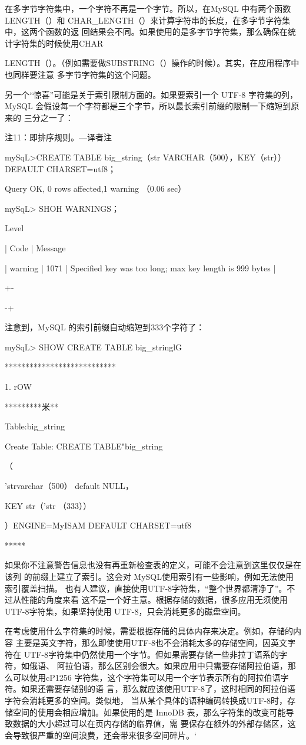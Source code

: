 在多字节字符集中，一个字符不再是一个字节。所以，在MySQL 中有两个函数
LENGTH（）和 CHAR\_LENGTH（）来计算字符串的长度，在多字节字符集中，这两个函数的返
回结果会不同。如果使用的是多字节字符集，那么确保在统计字符集的时候使用CHAR

LENGTH（）。（例如需要做SUBSTRING（）操作的时候）。其实，在应用程序中也同样要注意
多字节字符集的这个问题。

另一个“惊喜”可能是关于索引限制方面的。如果要索引一个 UTF-8 字符集的列，
MySQL 会假设每一个字符都是三个字节，所以最长索引前缀的限制一下缩短到原来的
三分之一了：

注11：即排序规则。—译者注

mySqL>CREATE TABLE big\_string（str VARCHAR（500），KEY（str））DEFAULT CHARSET=utf8；

Query OK, 0 rows affected,1 warning （0.06 sec）

mySqL> SHOH WARNINGS；

Level

| Code | Message

| warning | 1071 | Specified key was too long; max key length is 999 bytes |

+-

-+

注意到，MySQL 的索引前缀自动缩短到333个字符了：

mySqL> SHOW CREATE TABLE big\_stringlG

***************************

1. rOW

*********米**

Table:big\_string

Create Table: CREATE TABLE"big\_string

（

'strvarchar（500） default NULL，

KEY str（'str （333））

）ENGINE=MyISAM DEFAULT CHARSET=utf8

*****

如果你不注意警告信息也没有再重新检查表的定义，可能不会注意到这里仅仅是在该列
的前缀上建立了索引。这会对 MySQL使用索引有一些影响，例如无法使用索引覆盖扫描。
也有人建议，直接使用UTF-8字符集，“整个世界都清净了”。不过从性能的角度来看
这不是一个好主意。根据存储的数据，很多应用无须使用UTF-8字符集，如果坚持使用
UTF-8，只会消耗更多的磁盘空间。

在考虑使用什么字符集的时候，需要根据存储的具体内存来决定。例如，存储的内容
主要是英文字符，那么即使使用UTF-8也不会消耗太多的存储空间，因英文字符在
UTF-8字符集中仍然使用一个字节。但如果需要存储一些非拉丁语系的字符，如俄语、
阿拉伯语，那么区别会很大。如果应用中只需要存储阿拉伯语，那么可以使用cP1256
字符集，这个字符集可以用一个字节表示所有的阿拉伯语字符。如果还需要存储别的语
言，那么就应该使用UTF-8了，这时相同的阿拉伯语字符会消耗更多的空间。类似地，
当从某个具体的语种编码转换成UTF-8时，存储空间的使用会相应增加。如果使用的是
InnoDB 表，那么字符集的改变可能导致数据的大小超过可以在页内存储的临界值，需
要保存在额外的外部存储区，这会导致很严重的空间浪费，还会带来很多空间碎片。‘

